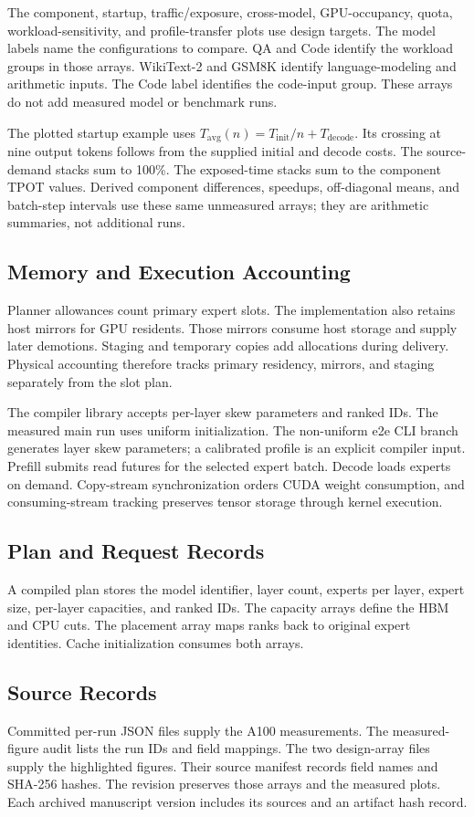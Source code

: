 \documentclass[conference,9pt,letterpaper]{IEEEtran}
\begin{document}
The component, startup, traffic/exposure, cross-model, GPU-occupancy, quota, workload-sensitivity, and profile-transfer plots use design targets. The model labels name the configurations to compare. QA and Code identify the workload groups in those arrays. WikiText-2 and GSM8K identify language-modeling and arithmetic inputs. The Code label identifies the code-input group. These arrays do not add measured model or benchmark runs.

The plotted startup example uses $T_{\mathrm{avg}}(n)=T_{\mathrm{init}}/n+T_{\mathrm{decode}}$. Its crossing at nine output tokens follows from the supplied initial and decode costs. The source-demand stacks sum to 100\%. The exposed-time stacks sum to the component TPOT values. Derived component differences, speedups, off-diagonal means, and batch-step intervals use these same unmeasured arrays; they are arithmetic summaries, not additional runs.

\subsection{Memory and Execution Accounting}
Planner allowances count primary expert slots. The implementation also retains host mirrors for GPU residents. Those mirrors consume host storage and supply later demotions. Staging and temporary copies add allocations during delivery. Physical accounting therefore tracks primary residency, mirrors, and staging separately from the slot plan.

The compiler library accepts per-layer skew parameters and ranked IDs. The measured main run uses uniform initialization. The non-uniform e2e CLI branch generates layer skew parameters; a calibrated profile is an explicit compiler input. Prefill submits read futures for the selected expert batch. Decode loads experts on demand. Copy-stream synchronization orders CUDA weight consumption, and consuming-stream tracking preserves tensor storage through kernel execution.

\subsection{Plan and Request Records}
A compiled plan stores the model identifier, layer count, experts per layer, expert size, per-layer capacities, and ranked IDs. The capacity arrays define the HBM and CPU cuts. The placement array maps ranks back to original expert identities. Cache initialization consumes both arrays.

\subsection{Source Records}
Committed per-run JSON files supply the A100 measurements. The measured-figure audit lists the run IDs and field mappings. The two design-array files supply the highlighted figures. Their source manifest records field names and SHA-256 hashes. The revision preserves those arrays and the measured plots. Each archived manuscript version includes its sources and an artifact hash record.
\end{document}
